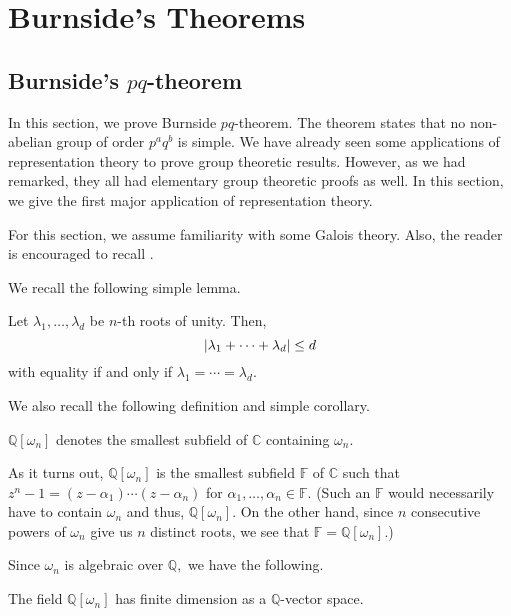\section{Burnside's Theorems} \label{sec:08}

\subsection{Burnside's \texorpdfstring{$pq$}{pq}-theorem}

In this section, we prove Burnside $pq$-theorem. The theorem states that no non-abelian group of order $p^aq^b$ is simple. We have already seen some applications of representation theory to prove group theoretic results. However, as we had remarked, they all had elementary group theoretic proofs as well. In this section, we give the first major application of representation theory. 

For this section, we assume familiarity with some Galois theory. Also, the reader is encouraged to recall .

We recall the following simple lemma.
\begin{lem} \label{lem:modofsumofrootsofunity}
	Let $\lambda_1, \ldots, \lambda_d$ be $n$-th roots of unity. Then,
	\begin{equation*} 
		{\left\lvert \lambda_1 + \cdots + \lambda_d \right\lvert} \le d
	\end{equation*}
	with equality if and only if $\lambda_1 = \cdots = \lambda_d.$
\end{lem}

We also recall the following definition and simple corollary.

\begin{defn}%
	$\mathbb{Q}[\omega_n]$ denotes the smallest subfield of $\mathbb{C}$ containing $\omega_n.$
\end{defn}

As it turns out, $\mathbb{Q}[\omega_n]$ is the smallest subfield $\mathbb{F}$ of $\mathbb{C}$ such that $z^n - 1 = (z - \alpha_1) \cdots (z - \alpha_n)$ for $\alpha_1, \ldots, \alpha_n \in \mathbb{F}.$ (Such an $\mathbb{F}$ would necessarily have to contain $\omega_n$ and thus, $\mathbb{Q}[\omega_n].$ On the other hand, since $n$ consecutive powers of $\omega_n$ give us $n$ distinct roots, we see that $\mathbb{F} = \mathbb{Q}[\omega_n].$) 

Since $\omega_n$ is algebraic over $\mathbb{Q},$ we have the following.

\begin{lem} 
	The field $\mathbb{Q}[\omega_n]$ has finite dimension as a $\mathbb{Q}$-vector space.
\end{lem}

